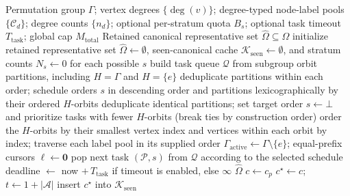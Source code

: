 \documentclass[a5paper, 10pt]{article}
\begin{document}
\begin{algorithm}
\caption{Subgroup-Lattice Descent}
\label{alg:enum}
\scriptsize
\setlength{\baselineskip}{7.5pt}
\begin{algorithmic}[1]
\Require Permutation group $\Gamma$; vertex degrees $\{\deg(v)\}$; degree-typed node-label pools $\{\mathcal{C}_d\}$; degree counts $\{n_d\}$; optional per-stratum quota $B_s$; optional task timeout $T_{\mathrm{task}}$; global cap $M_{\mathrm{total}}$
\Ensure Retained canonical representative set $\widehat{\Omega}\subseteq\Omega$
\State initialize retained representative set $\widehat{\Omega}\gets\emptyset$, seen-canonical cache $\mathcal{K}_{\mathrm{seen}}\gets\emptyset$, and stratum counts $N_s\gets 0$ for each possible $s$
\State build task queue $\mathcal{Q}$ from subgroup orbit partitions, including $H=\Gamma$ and $H=\{e\}$
    \State deduplicate partitions within each order; schedule orders $s$ in descending order and partitions lexicographically by their ordered $H$-orbits
\Else
    \State deduplicate identical partitions; set target order $s\gets\bot$ and prioritize tasks with fewer $H$-orbits (break ties by construction order)
\EndIf
\State order the $H$-orbits by their smallest vertex index and vertices within each orbit by index; traverse each label pool in its supplied order
\State $\Gamma_{\mathrm{active}} \gets \Gamma\setminus\{e\}$; equal-prefix cursors $\boldsymbol{\ell}\gets\mathbf{0}$
    \State pop next task $(\mathcal{P},s)$ from $\mathcal{Q}$ according to the selected schedule
        \State deadline $\gets$ now $+\,T_{\mathrm{task}}$ if timeout is enabled, else $\infty$
        \State {}
    \EndIf
\EndWhile
\State \Return $\widehat{\Omega}$
\Statex
{}
        \State \Return
    \EndIf
        \State $c\gets c_p$ 
        \State $c^{\star} \gets c$; $t\gets 1+|\mathcal{A}|$ 
            \State insert $c^{\star}$ into $\mathcal{K}_{\mathrm{seen}}$

\end{algorithmic}
\end{algorithm}
\end{document}
